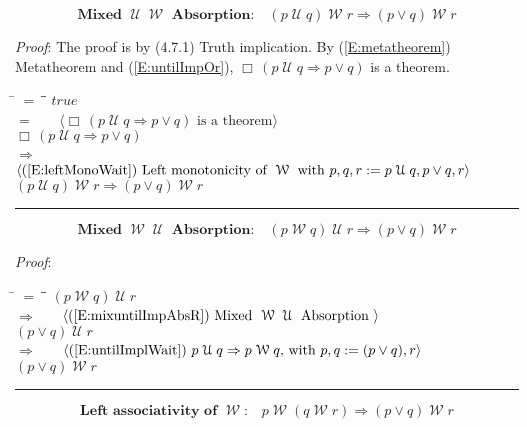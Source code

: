 \documentclass[12pt, fleqn, leqno]{article}
\newcommand{\lgap}{2pt}                             %
\newcommand{\mymathindent}{24pt}                    %
\newcommand{\impl}{\ensuremath{\Rightarrow}}        %
\newcommand{\Until}{\;\mathcal{U}\;}
\newcommand{\Wait}{\;\mathcal{W}\;}
\newcommand{\Always}{\Box\,}
\newcommand{\myqed}{\rule[-.23ex]{1.2ex}{2.0ex}}
\newcommand{\myqedtab}{\hspace{384pt}}              %
\newcommand{\Gll} {\langle}                         %
\newcommand{\Ggg} {\rangle}                         %
\newcommand{\Hint}[1]     {\ \ \ $\Gll              \mbox{#1} \Ggg$ }   %
\begin{document}
\begin{equation}\label{E:mix2untilImpAbsR}
\textbf{Mixed $\Until\Wait$ Absorption:}\quad (p \Until q) \Wait r \impl (p \lor q) \Wait r
\end{equation}

\emph{Proof}: The proof is by (4.7.1) Truth implication.
By (\ref{E:metatheorem}) Metatheorem and (\ref{E:untilImpOr}), $\Always (p\Until q\impl p\lor q)$ is a theorem.
\begin{tabbing}
\hspace{\mymathindent} \= $= \;$ \= \myqedtab \= \kill
  \> \>   $true$\\[\lgap]
  \> $=$ \> \Hint{$\Always (p\Until q\impl p\lor q)$ is a theorem} \\[\lgap]
  \> \>   $\Always (p\Until q\impl p\lor q)$\\[\lgap]
  \> $\impl$  \>  \Hint{(\ref{E:leftMonoWait}) Left monotonicity of $\Wait$ with $p,q,r := p\Until q, p\lor q, r$}\\[\lgap]
  \> \>   $(p \Until q) \Wait r \impl (p \lor q) \Wait r$ \quad \myqed
\end{tabbing}

\begin{equation}\label{E:mix3untilImpAbsR}
\textbf{Mixed $\Wait\Until$ Absorption:}\quad (p \Wait q) \Until r \impl (p \lor q) \Wait r
\end{equation}

\emph{Proof}: 
\begin{tabbing}
\hspace{\mymathindent} \= $= \;$ \= \myqedtab \= \kill
  \> \>   $(p\Wait q)\Until r$\\[\lgap]
  \> $\impl$  \>  \Hint{(\ref{E:mixuntilImpAbsR}) Mixed $\Wait\Until$ Absorption }\\[\lgap]
  \> \>   $(p \lor q) \Until r$\\[\lgap]
  \> $\impl$  \>  \Hint{(\ref{E:untilImplWait}) $p\Until q\impl p\Wait q$, with $p,q := (p\lor q), r$}\\[\lgap]
  \> \>   $(p \lor q) \Wait r$ \quad \myqed
\end{tabbing}

\begin{equation}\label{E:leftAssocWait}
\textbf{Left associativity of $\Wait$:}\quad p \Wait (q \Wait r) \impl (p \lor q) \Wait r
\end{equation}
\end{document}
